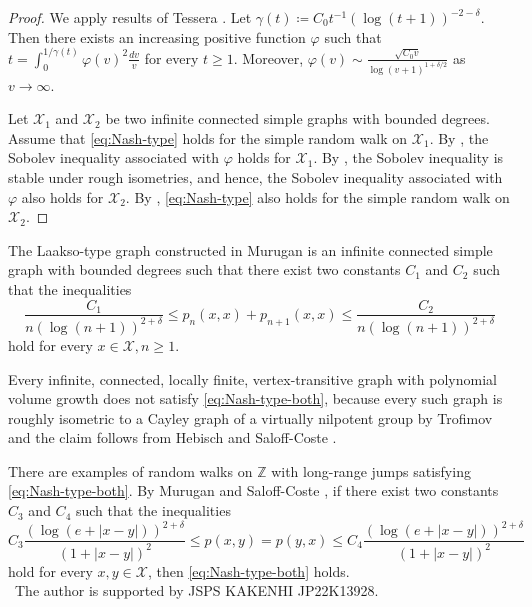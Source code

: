\documentclass[a4paper, reqno, 11pt]{amsart}
\theoremstyle{definition}
\begin{document}
\begin{proof}
We apply results of Tessera \cite{Tessera2008}. 
Let $\gamma(t) \coloneqq C_0 t^{-1} (\log (t+1))^{-2-\delta}$. 
Then there exists an increasing positive function $\varphi$ such that 
$t = \int_0^{1/\gamma(t)} \varphi(v)^2 \frac{dv}{v}$ for every $t \ge 1$. 
Moreover, 
$\varphi(v) \sim \frac{\sqrt{C_0 v}}{\log(v+1)^{1+\delta/2}}$ as $v \to \infty$. 

Let $\mathcal{X}_1$ and $\mathcal{X}_2$ be two infinite connected simple graphs with bounded degrees. 
Assume that \eqref{eq:Nash-type} holds for the simple random walk on $\mathcal{X}_1$. 
By \cite[Theorem 3.5 (ii)]{Tessera2008}, 
the Sobolev inequality associated with $\varphi$ holds for $\mathcal{X}_1$. 
By \cite[Theorem 8.1]{Tessera2008}, 
the Sobolev inequality is stable under rough isometries, and hence, 
the Sobolev inequality associated with $\varphi$ also holds for $\mathcal{X}_2$. 
By \cite[Theorem 3.5 (i)]{Tessera2008}, 
 \eqref{eq:Nash-type} also holds for the simple random walk on $\mathcal{X}_2$. 
\end{proof}

The Laakso-type graph constructed in Murugan \cite[Theorem 5.13]{Murugan2025} is an infinite connected simple graph with bounded degrees such that 
there exist two constants  $C_1$ and $C_2$  such that the inequalities 
\begin{equation}\label{eq:Nash-type-both}
\frac{C_1}{n (\log (n+1))^{2+\delta}}  \le p_n (x,x) + p_{n+1}(x,x) \le \frac{C_2}{n (\log (n+1))^{2+\delta}} 
\end{equation} 
hold for every $x \in \mathcal{X}, n \ge 1$. 

Every infinite, connected, locally finite, vertex-transitive graph with polynomial volume growth does not satisfy \eqref{eq:Nash-type-both}, 
because every such graph is roughly isometric to a Cayley graph of a virtually nilpotent group by Trofimov \cite{Trifomov1985} and the claim follows from Hebisch and Saloff-Coste \cite{HSC1993}. 

There are examples of random walks on $\mathbb{Z}$ with long-range jumps satisfying \eqref{eq:Nash-type-both}. 
By Murugan and Saloff-Coste \cite[Theorem 1.1]{MSC2015}, 
if there exist two constants  $C_3$ and $C_4$  such that the inequalities 
\[  C_3 \frac{(\log(e+|x-y|))^{2+\delta}}{(1+|x-y|)^2} \le p(x,y) = p(y,x) \le C_4 \frac{(\log(e+|x-y|))^{2+\delta}}{(1+|x-y|)^2}\]
hold for every $x, y \in \mathcal{X}$, 
then \eqref{eq:Nash-type-both} holds. \\




 \ The author is supported by JSPS KAKENHI JP22K13928. \\



 
\end{document}
